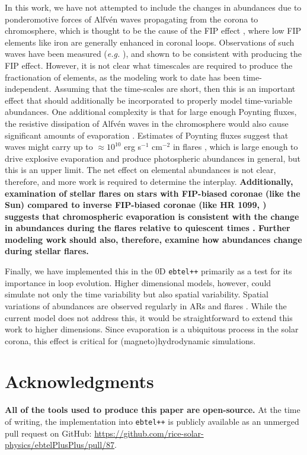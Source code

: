 \documentclass[twocolumn]{aastex631}
\begin{document}
In this work, we have not attempted to include the changes in abundances due to ponderomotive forces of Alfv\'en waves propagating from the corona to chromosphere, which is thought to be the cause of the FIP effect \citep{laming2015}, where low FIP elements like iron are generally enhanced in coronal loops.  Observations of such waves have been measured (\textit{e.g.} \citealt{murabito2024}), and shown to be consistent with producing the FIP effect.  However, it is not clear what timescales are required to produce the fractionation of elements, as the modeling work to date has been time-independent.  Assuming that the time-scales are short, then this is an important effect that should additionally be incorporated to properly model time-variable abundances.  One additional complexity is that for large enough Poynting fluxes, the resistive dissipation of Alfv\'en waves in the chromosphere would also cause significant amounts of evaporation \citep{reep2016}.  Estimates of Poynting fluxes suggest that waves might carry up to $\approx 10^{10}$ erg s$^{-1}$ cm$^{-2}$ in flares \citep{russell2023}, which is large enough to drive explosive evaporation and produce photospheric abundances in general, but this is an upper limit.   The net effect on elemental abundances is not clear, therefore, and more work is required to determine the interplay.  \textbf{Additionally, examination of stellar flares on stars with FIP-biased coronae (like the Sun) compared to inverse FIP-biased coronae (like HR 1099, \citealt{brinkman2001}) suggests that chromospheric evaporation is consistent with the change in abundances during the flares relative to quiescent times \citep{nordon2008}.  Further modeling work should also, therefore, examine how abundances change during stellar flares.}  

Finally, we have implemented this in the 0D \texttt{ebtel++} primarily as a test for its importance in loop evolution.  Higher dimensional models, however, could simulate not only the time variability but also spatial variability.  Spatial variations of abundances are observed regularly in ARs and flares \citep{doschek2018,baker2021,to2021,long2024}.  While the current model does not address this, it would be straightforward to extend this work to higher dimensions.  Since evaporation is a ubiquitous process in the solar corona, this effect is critical for (magneto)hydrodynamic simulations.  


\section*{Acknowledgments}
\textbf{All of the tools used to produce this paper are open-source.}  At the time of writing, the implementation into \texttt{ebtel++} is publicly available as an unmerged pull request on GitHub: \url{https://github.com/rice-solar-physics/ebtelPlusPlus/pull/87}.  
\end{document}
